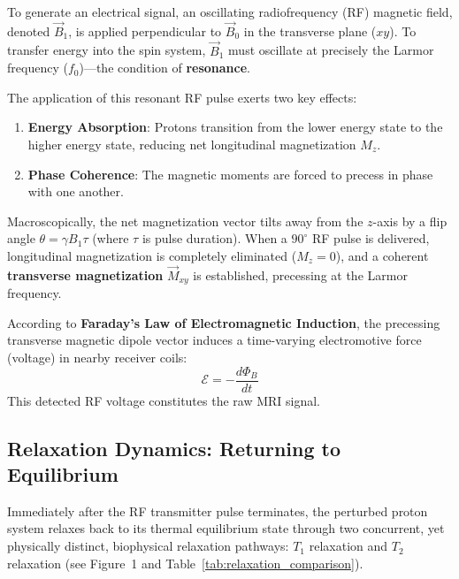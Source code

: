 \documentclass[11pt,a4paper]{article}
\begin{document}
To generate an electrical signal, an oscillating radiofrequency (RF) magnetic field, denoted $\vec{B}_1$, is applied perpendicular to $\vec{B}_0$ in the transverse plane ($xy$). To transfer energy into the spin system, $\vec{B}_1$ must oscillate at precisely the Larmor frequency ($f_0$)—the condition of \textbf{resonance}.

The application of this resonant RF pulse exerts two key effects:
\begin{enumerate}
    \item \textbf{Energy Absorption}: Protons transition from the lower energy state to the higher energy state, reducing net longitudinal magnetization $M_z$.
    \item \textbf{Phase Coherence}: The magnetic moments are forced to precess in phase with one another.
\end{enumerate}

Macroscopically, the net magnetization vector tilts away from the $z$-axis by a flip angle $\theta = \gamma B_1 \tau$ (where $\tau$ is pulse duration). When a $90^\circ$ RF pulse is delivered, longitudinal magnetization is completely eliminated ($M_z = 0$), and a coherent \textbf{transverse magnetization} $\vec{M}_{xy}$ is established, precessing at the Larmor frequency.

According to \textbf{Faraday's Law of Electromagnetic Induction}, the precessing transverse magnetic dipole vector induces a time-varying electromotive force (voltage) in nearby receiver coils:
\begin{equation}
    \mathcal{E} = -\frac{d\Phi_B}{dt}
\end{equation}
This detected RF voltage constitutes the raw MRI signal.

\subsection{Relaxation Dynamics: Returning to Equilibrium}
Immediately after the RF transmitter pulse terminates, the perturbed proton system relaxes back to its thermal equilibrium state through two concurrent, yet physically distinct, biophysical relaxation pathways: $T_1$ relaxation and $T_2$ relaxation (see Figure~1 and Table~\ref{tab:relaxation_comparison}).
\end{document}
